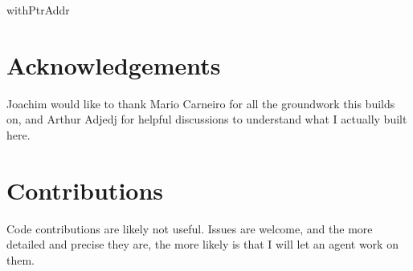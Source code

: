 \documentclass{article}
\begin{document}
\begin{leanblock}[view=lean, sum=7Wyq4GRE8w]{withPtrAddr}{}
\end{leanblock}

\section*{Acknowledgements}

Joachim would like to thank Mario Carneiro for all the groundwork this builds on, and Arthur Adjedj for helpful discussions to understand what I actually built here.

\section*{Contributions}

Code contributions are likely not useful. Issues are welcome, and the more detailed and precise they are, the more likely is that I will let an agent work on them.
\end{document}
